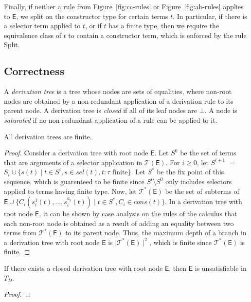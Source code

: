 \documentclass[a4paper,oribibl,envcountsame,draft]{llncs}
\newcommand{\Ec}{\mathsf{E}}
\newcommand{\tEc}{\mathcal{T}(\Ec)}
\newcommand{\tcEc}{\mathcal{T}^\ast(\Ec)}
\newcommand{\rn}[1]{\textsf{\small #1}}
\newcommand{\thD}{T_{D}}
\begin{document}
Finally, if neither a rule from Figure~\ref{fig:cc-rules} or Figure~\ref{fig:ab-rules} applies to $\Ec$, 
we split on the constructor type for certain terms $t$.
In particular, if there is a selector term applied to $t$, or if $t$ has a finite type, 
then we require the equivalence class of $t$ to contain a constructor term, which is enforced by the rule \rn{Split}.

\subsection{Correctness}

A \emph{derivation tree} is a tree whose nodes are sets of equalities, where non-root nodes are obtained by 
a non-redundant application of a derivation rule to its parent node.
A derivation tree is \emph{closed} if all of its leaf nodes are $\bot$.
A node is \emph{saturated} if no non-redundant application of a rule can be applied to it.

\begin{lemma}[Termination]
All derivation trees are finite.
\end{lemma}
\begin{proof}
Consider a derivation tree with root node $\Ec$.
Let $S^0$ be the set of terms that are arguments of a selector application in $\tEc$.
For $i \geq 0$, let $S^{i+1}$ $=$ $S_i \cup \{ s( t ) \mid t \in S^i, s \in sel( t ), t : \tau \text{ finite} \}$.
Let $S^\ast$ be the fix point of this sequence, which is guarenteed to be finite 
since $S^i \setminus S^0$ only includes selectors applied to terms having finite type.
Now, let $\tcEc$ be the set of subterms of $\Ec \cup \{ C_i( s^1_i( t ), \ldots, s^{a_j}_i( t ) ) \mid t \in S^\ast, C_i \in cons( t ) \}$.
In a derivation tree with root node $\Ec$, 
it can be shown by case analysis on the rules of the calculus that each non-root node is 
obtained as a result of adding an equality between two terms from $\tcEc$ to its parent node.
Thus, the maximum depth of a branch in a derivation tree with root node $\Ec$ is $\mid \tcEc \mid^2$,
which is finite since $\tcEc$ is finite.
\end{proof}

\begin{lemma}
If there exists a closed derivation tree with root node $\Ec$, then $\Ec$ is unsatisfiable in $\thD$.
\end{lemma}
\begin{proof}
\end{proof}
\end{document}
